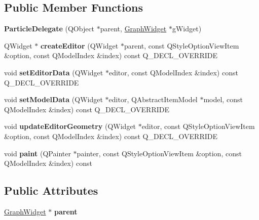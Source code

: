 \subsection*{Public Member Functions}
\begin{DoxyCompactItemize}
\item 
\mbox{\label{class_particle_delegate_aea124e1c4d6b75f73e3348b2f9505da5}} 
{\bfseries Particle\+Delegate} (Q\+Object $\ast$parent, \hyperlink{class_graph_widget}{Graph\+Widget} $\ast$g\+Widget)
\item 
\mbox{\label{class_particle_delegate_aa9e41110dc09d65498a7a538e5ac884d}} 
Q\+Widget $\ast$ {\bfseries create\+Editor} (Q\+Widget $\ast$parent, const Q\+Style\+Option\+View\+Item \&option, const Q\+Model\+Index \&index) const Q\+\_\+\+D\+E\+C\+L\+\_\+\+O\+V\+E\+R\+R\+I\+DE
\item 
\mbox{\label{class_particle_delegate_a1a2de94ef3d40938a57f07d062f0e61b}} 
void {\bfseries set\+Editor\+Data} (Q\+Widget $\ast$editor, const Q\+Model\+Index \&index) const Q\+\_\+\+D\+E\+C\+L\+\_\+\+O\+V\+E\+R\+R\+I\+DE
\item 
\mbox{\label{class_particle_delegate_ae6f4bab3297994eb4b3c029fdfe37200}} 
void {\bfseries set\+Model\+Data} (Q\+Widget $\ast$editor, Q\+Abstract\+Item\+Model $\ast$model, const Q\+Model\+Index \&index) const Q\+\_\+\+D\+E\+C\+L\+\_\+\+O\+V\+E\+R\+R\+I\+DE
\item 
\mbox{\label{class_particle_delegate_a5b0da701705322367f6760cbb4c8fd43}} 
void {\bfseries update\+Editor\+Geometry} (Q\+Widget $\ast$editor, const Q\+Style\+Option\+View\+Item \&option, const Q\+Model\+Index \&index) const Q\+\_\+\+D\+E\+C\+L\+\_\+\+O\+V\+E\+R\+R\+I\+DE
\item 
\mbox{\label{class_particle_delegate_a79836309711ef91b81f2d2514088cabb}} 
void {\bfseries paint} (Q\+Painter $\ast$painter, const Q\+Style\+Option\+View\+Item \&option, const Q\+Model\+Index \&index) const
\end{DoxyCompactItemize}
\subsection*{Public Attributes}
\begin{DoxyCompactItemize}
\item 
\mbox{\label{class_particle_delegate_a52db74e84f2d130fddf57524753d74a0}} 
\hyperlink{class_graph_widget}{Graph\+Widget} $\ast$ {\bfseries parent}
\end{DoxyCompactItemize}


